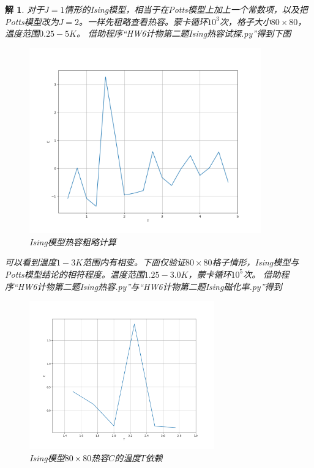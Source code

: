 \documentclass[10pt]{ctexart}
\newtheorem*{solution}{解}
\begin{document}
\begin{solution}
    对于$J=1$情形的Ising模型，相当于在Potts模型上加上一个常数项，以及把Potts模型改为$J=2$。一样先粗略查看热容。蒙卡循环$10^3$次，格子大小$80\times 80$，温度范围$0.25-5K$。
借助程序“HW6计物第二题Ising热容试探.py”得到下图
    \begin{figure}[H]
        \centering
        \includegraphics[width=10cm]{Ising_rough_80.png}
        \caption{Ising模型热容粗略计算}
    \end{figure}
    可以看到温度$1-3K$范围内有相变。下面仅验证$80\times 80$格子情形，Ising模型与Potts模型结论的相符程度。温度范围$1.25-3.0K$，蒙卡循环$10^5$次。
    借助程序“HW6计物第二题Ising热容.py”与“HW6计物第二题Ising磁化率.py”得到
    \begin{figure}[H]
        \centering
        \begin{minipage}{0.45\linewidth}
            \centering
            \includegraphics[width=8cm]{Ising_C_80.png}
            \caption{Ising模型$80\times 80$热容$C$的温度$T$依赖}
        \end{minipage}
        \qquad
        \begin{minipage}{0.45\linewidth}
            \centering

\end{minipage}
\end{figure}
\end{solution}
\end{document}
